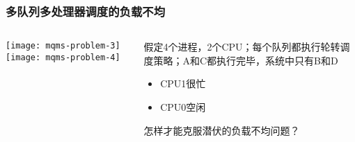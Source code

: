 

\begin{frame}
    \frametitle{多队列多处理器调度的负载不均}
	\begin{columns}
		\begin{column}{.5\textwidth}
			\texttt{[image: mqms-problem-3]}
			\texttt{[image: mqms-problem-4]}	
		\end{column}
		
		\begin{column}{.5\textwidth}
			\large
			\normalsize
			假定4个进程，2个CPU；每个队列都执行轮转调度策略；A和C都执行完毕，系统中只有B和D
			\begin{itemize}
				\item CPU1很忙
				\item CPU0空闲
				
			\end{itemize} \pause
		\Large
		怎样才能克服潜伏的负载不均问题？
		\end{column}
	\end{columns}
\end{frame}



